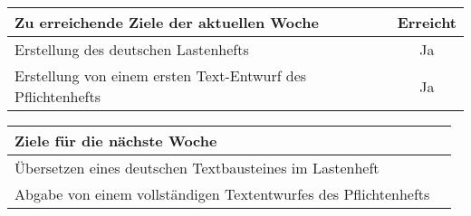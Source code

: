 \begin{tabularx}{\textwidth}{Xc}
    \arrayrulecolor{OliveGreen}
    \toprule
    {\bfseries Zu erreichende Ziele der aktuellen Woche} & {\bfseries Erreicht} \\
    \midrule[2pt]
    Erstellung des deutschen Lastenhefts                 &Ja                    \\
    \rowcolor{OliveGreen!15}
    Erstellung von einem ersten Text-Entwurf des Pflichtenhefts  &Ja                    \\
    \bottomrule[2pt]
\end{tabularx}
%
\vspace{1cm}
%
\begin{tabularx}{\textwidth}{Xc}
    \arrayrulecolor{OliveGreen}
    \toprule
    {\bfseries Ziele für die nächste Woche}              &                      \\
    \midrule[2pt]
    Übersetzen eines deutschen Textbausteines im Lastenheft                                 &                      \\
    \rowcolor{OliveGreen!15}
    Abgabe von einem vollständigen Textentwurfes des Pflichtenhefts                              &                      \\
\end{tabularx}
